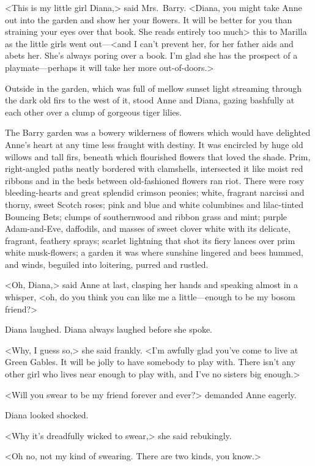 <This is my little girl Diana,> said Mrs.~Barry. <Diana, you might take Anne out into the garden and show her your flowers. It will be better for you than straining your eyes over that book. She reads entirely too much\longdash> this to Marilla as the little girls went out—<and I can't prevent her, for her father aids and abets her. She's always poring over a book. I'm glad she has the prospect of a playmate—perhaps it will take her more out-of-doors.>

Outside in the garden, which was full of mellow sunset light streaming through the dark old firs to the west of it, stood Anne and Diana, gazing bashfully at each other over a clump of gorgeous tiger lilies.

The Barry garden was a bowery wilderness of flowers which would have delighted Anne's heart at any time less fraught with destiny. It was encircled by huge old willows and tall firs, beneath which flourished flowers that loved the shade. Prim, right-angled paths neatly bordered with clamshells, intersected it like moist red ribbons and in the beds between old-fashioned flowers ran riot. There were rosy bleeding-hearts and great splendid crimson peonies; white, fragrant narcissi and thorny, sweet Scotch roses; pink and blue and white columbines and lilac-tinted Bouncing Bets; clumps of southernwood and ribbon grass and mint; purple Adam-and-Eve, daffodils, and masses of sweet clover white with its delicate, fragrant, feathery sprays; scarlet lightning that shot its fiery lances over prim white musk-flowers; a garden it was where sunshine lingered and bees hummed, and winds, beguiled into loitering, purred and rustled.

<Oh, Diana,> said Anne at last, clasping her hands and speaking almost in a whisper, <oh, do you think you can like me a little—enough to be my bosom friend?>

Diana laughed. Diana always laughed before she spoke.

<Why, I guess so,> she said frankly. <I'm awfully glad you've come to live at Green Gables. It will be jolly to have somebody to play with. There isn't any other girl who lives near enough to play with, and I've no sisters big enough.>

<Will you swear to be my friend forever and ever?> demanded Anne eagerly.

Diana looked shocked.

<Why it's dreadfully wicked to swear,> she said rebukingly.

<Oh no, not my kind of swearing. There are two kinds, you know.>

